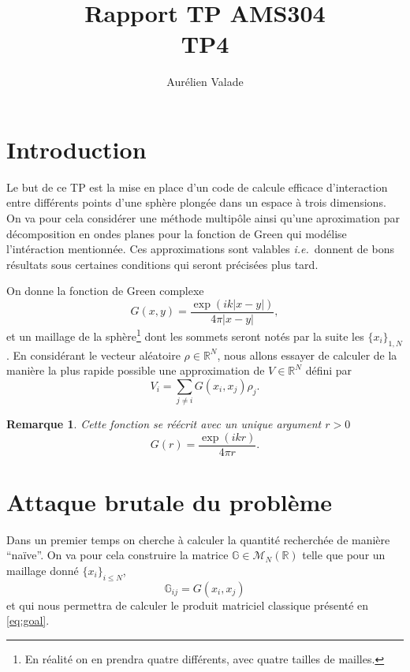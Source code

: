 \documentclass[11pt]{article}
\title{Rapport TP AMS304 \\ TP4}
\author{Aurélien Valade}
\date{}
\newtheorem{rmq}{Remarque}
\newcommand{\ie}{\emph{i.e.}~}
\newcommand{\R}{\mathbb{R}}
\newcommand{\Gm}{\mathbb{G}}
\begin{document}
\maketitle

\section{Introduction}

Le but de ce TP est la mise en place d'un code de calcule efficace d'interaction entre différents points d'une sphère plongée dans un espace à
trois dimensions. On va pour cela considérer une méthode multipôle ainsi qu'une aproximation par décomposition en ondes planes pour la
fonction de Green qui modélise l'intéraction mentionnée. Ces approximations sont valables \ie donnent de bons résultats sous certaines
conditions qui seront précisées plus tard.

On donne la fonction de Green complexe
\begin{equation}
  \label{eq:green}
  G(x, y) = \frac{\exp(i k |x-y|)}{4\pi|x-y|},
\end{equation}
et un maillage de la sphère\footnote{En réalité on en prendra quatre différents, avec quatre tailles de mailles.} dont les sommets seront notés
par la suite les $\{x_i\}_{1, N}$. En considérant le vecteur aléatoire $\rho \in \R^N$, nous allons essayer de calculer de la
manière la plus rapide possible une approximation de $V \in \R^N$ défini par 
\begin{equation}
  \label{eq:goal}
  V_i = \sum_{j\neq i}G(x_i, x_j) \rho_j.
\end{equation}

\begin{rmq}
  Cette fonction se réécrit avec un unique argument $r>0$
  \[
    G(r) = \frac{\exp(i k r)}{4\pi r}.
  \]
\end{rmq}

\section{Attaque brutale du problème}

Dans un premier temps on cherche à calculer la quantité recherchée de manière ``naïve''. On va pour cela construire la matrice $\Gm\in\mathcal{M}_N(\R)$ telle que
pour un maillage donné $\{x_i\}_{i\leq N}$, 
\[
  \Gm_{ij} = G(x_i, x_j)
\]
et qui nous permettra de calculer le produit matriciel classique présenté en \autoref{eq:goal}.
\end{document}
